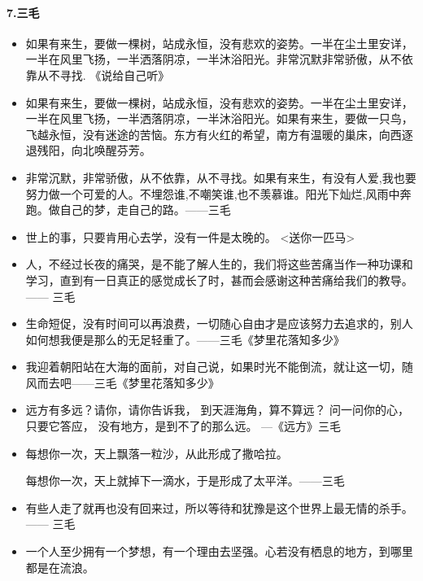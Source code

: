 \documentclass[UTF8,a4paper,8pt]{ctexbook}
\begin{document}
	\paragraph{7.三毛}
			\begin{itemize}
				\item 如果有来生，要做一棵树，站成永恒，没有悲欢的姿势。一半在尘土里安详，一半在风里飞扬，一半洒落阴凉，一半沐浴阳光。非常沉默非常骄傲，从不依靠从不寻找.   《说给自己听》
				\item 如果有来生，要做一棵树，站成永恒，没有悲欢的姿势。一半在尘土里安详，一半在风里飞扬，一半洒落阴凉，一半沐浴阳光。如果有来生，要做一只鸟，飞越永恒，没有迷途的苦恼。东方有火红的希望，南方有温暖的巢床，向西逐退残阳，向北唤醒芬芳。
				\item 非常沉默，非常骄傲，从不依靠，从不寻找。如果有来生，有没有人爱,我也要努力做一个可爱的人。不埋怨谁,不嘲笑谁,也不羡慕谁。阳光下灿烂,风雨中奔跑。做自己的梦，走自己的路。——三毛
				
				\item 世上的事，只要肯用心去学，没有一件是太晚的。 <送你一匹马>
				
				\item 人，不经过长夜的痛哭，是不能了解人生的，我们将这些苦痛当作一种功课和学习，直到有一日真正的感觉成长了时，甚而会感谢这种苦痛给我们的教导。—— 三毛
				
				\item 生命短促，没有时间可以再浪费，一切随心自由才是应该努力去追求的，别人如何想我便是那么的无足轻重了。——三毛《梦里花落知多少》
				
				\item 我迎着朝阳站在大海的面前，对自己说，如果时光不能倒流，就让这一切，随风而去吧——三毛《梦里花落知多少》
				
				\item 远方有多远？请你，请你告诉我， 到天涯海角，算不算远？ 问一问你的心，只要它答应， 没有地方，是到不了的那么远。 ---《远方》三毛
				
				\item 每想你一次，天上飘落一粒沙，从此形成了撒哈拉。
				
				 每想你一次，天上就掉下一滴水，于是形成了太平洋。——三毛
				 
				\item 有些人走了就再也没有回来过，所以等待和犹豫是这个世界上最无情的杀手。 —— 三毛
				
				\item 一个人至少拥有一个梦想，有一个理由去坚强。心若没有栖息的地方，到哪里都是在流浪。
				

\end{itemize}
\end{document}
